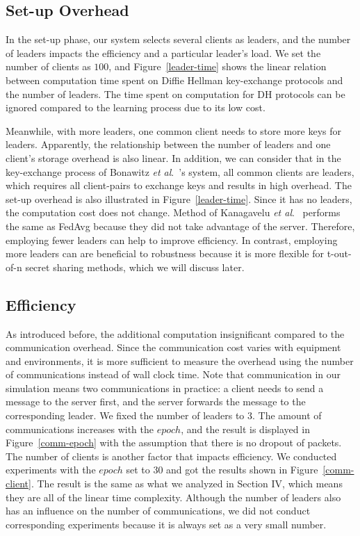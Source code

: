 \subsection{Set-up Overhead}
In the set-up phase, our system selects several clients as leaders, and the number of leaders impacts the efficiency and a particular leader's load. We set the number of clients as $100$, and Figure~\ref{leader-time} shows the linear relation between computation time spent on Diffie Hellman key-exchange protocols and the number of leaders. The time spent on computation for DH protocols can be ignored compared to the learning process due to its low cost.

Meanwhile, with more leaders, one common client needs to store more keys for leaders. Apparently, the relationship between the number of leaders and one client's storage overhead is also linear. In addition, we can consider that in the key-exchange process of Bonawitz \emph{et al}.~\cite{Practical}'s system, all common clients are leaders, which requires all client-pairs to exchange keys and results in high overhead. The set-up overhead is also illustrated in Figure~\ref{leader-time}. Since it has no leaders, the computation cost does not change. Method of Kanagavelu \emph{et al}.~\cite{Two-Phase} performs the same as FedAvg because they did not take advantage of the server. Therefore, employing fewer leaders can help to improve efficiency. In contrast, employing more leaders can are beneficial to robustness because it is more flexible for t-out-of-n secret sharing methods, which we will discuss later. 


\subsection{Efficiency}
As introduced before, the additional computation insignificant compared to the communication overhead. Since the communication cost varies with equipment and environments, it is more sufficient to measure the overhead using the number of communications instead of wall clock time. Note that communication in our simulation means two communications in practice: a client needs to send a message to the server first, and the server forwards the message to the corresponding leader. We fixed the number of leaders to 3. The amount of communications increases with the $epoch$, and the result is displayed in Figure~\ref{comm-epoch} with the assumption that there is no dropout of packets. The number of clients is another factor that impacts efficiency. We conducted experiments with the $epoch$ set to 30 and got the results shown in Figure~\ref{comm-client}. The result is the same as what we analyzed in Section IV, which means they are all of the linear time complexity. Although the number of leaders also has an influence on the number of communications, we did not conduct corresponding experiments because it is always set as a very small number. 


